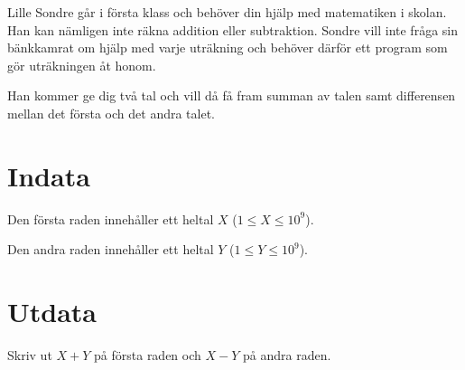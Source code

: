 Lille Sondre går i första klass och behöver din hjälp med matematiken i skolan. Han
kan nämligen inte räkna addition eller subtraktion. Sondre vill inte fråga sin
bänkkamrat om hjälp med varje uträkning och behöver därför ett program som gör uträkningen åt honom.

Han kommer ge dig två tal och vill då få fram summan av talen samt differensen mellan det första och det andra talet.

\section*{Indata}
Den första raden innehåller ett heltal $X$ ($1 \leq X \leq 10^9$).

Den andra raden innehåller ett heltal $Y$ ($1 \leq Y \leq 10^9$).

\section*{Utdata}
Skriv ut $X + Y$ på första raden och $X - Y$ på andra raden.
